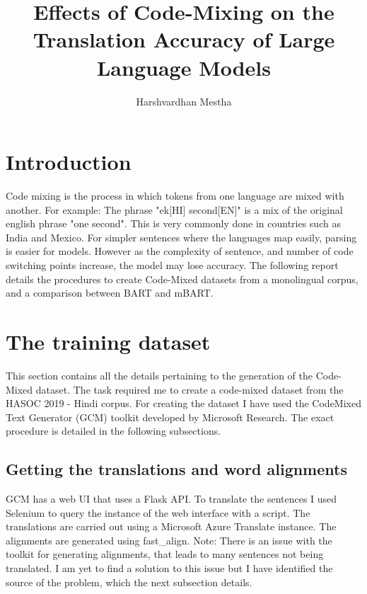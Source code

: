 \documentclass{article}
\title{Effects of Code-Mixing on the Translation Accuracy of Large Language Models}
\author{Harshvardhan Mestha}
\date{}
\begin{document}

\tableofcontents
\pagebreak
\maketitle

\section{Introduction}
Code mixing is the process in which tokens from one language are mixed with another.
For example: The phrase "ek[HI] second[EN]" is a mix of the original english phrase "one second". 
This is very commonly done in countries such as India and Mexico.
For simpler sentences where the languages map easily, parsing is easier for models.
However as the complexity of sentence, and number of code switching points increase, the model may lose accuracy.
The following report details the procedures to create Code-Mixed datasets from a monolingual corpus, and a comparison between BART and mBART.

\section{The training dataset}
This section contains all the details pertaining to the generation of the Code-Mixed dataset.
The task required me to create a code-mixed dataset from the HASOC 2019 - Hindi corpus. 
For creating the dataset I have used the CodeMixed Text Generator (GCM) toolkit developed by Microsoft Research.
The exact procedure is detailed in the following subsections.

\subsection{Getting the translations and word alignments}
GCM has a web UI that uses a Flask API.
To translate the sentences I used Selenium to query the instance of the web interface with a script.
The translations are carried out using a Microsoft Azure Translate instance.
The alignments are generated using fast\_align.
\newline
\newline
Note: There is an issue with the toolkit for generating alignments, that leads to many sentences not being translated. I am yet to find a solution to this issue but I have identified the source of the problem, which the next subsection details.
\end{document}
